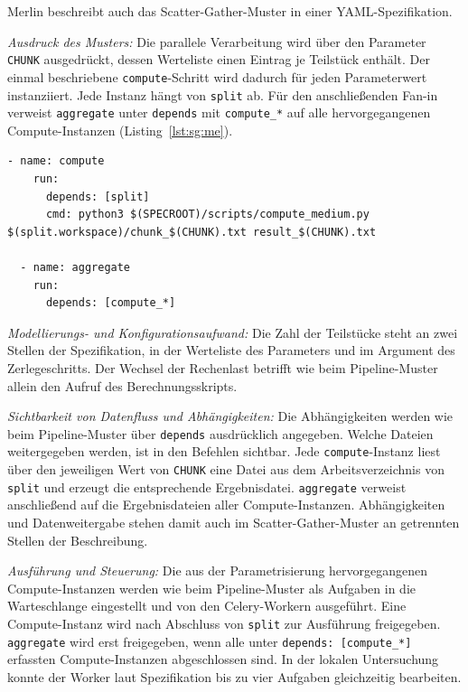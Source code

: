 Merlin beschreibt auch das Scatter-Gather-Muster in einer
YAML-Spezifikation.


\emph{Ausdruck des Musters:} Die parallele Verarbeitung wird über
den Parameter \texttt{CHUNK} ausgedrückt, dessen Werteliste einen
Eintrag je Teilstück enthält. Der einmal beschriebene
\texttt{compute}-Schritt wird dadurch für jeden Parameterwert
instanziiert. Jede Instanz hängt von \texttt{split} ab. Für den
anschließenden Fan-in verweist \texttt{aggregate} unter
\texttt{depends} mit \texttt{compute\_*} auf alle hervorgegangenen Compute-Instanzen (Listing~\ref{lst:sg:me}).

\begin{lstlisting}[caption={Parametrisierter Verarbeitungsschritt und Fan-in (Merlin, Scatter-Gather)},label={lst:sg:me}]
  - name: compute
    run:
      depends: [split]
      cmd: python3 $(SPECROOT)/scripts/compute_medium.py $(split.workspace)/chunk_$(CHUNK).txt result_$(CHUNK).txt

  - name: aggregate
    run:
      depends: [compute_*]
\end{lstlisting}

\emph{Modellierungs- und Konfigurationsaufwand:} Die Zahl der
Teilstücke steht an zwei Stellen der Spezifikation, in der
Werteliste des Parameters und im Argument des Zerlegeschritts. Der
Wechsel der Rechenlast betrifft wie beim Pipeline-Muster allein den
Aufruf des Berechnungsskripts.

\begin{sloppypar}
\emph{Sichtbarkeit von Datenfluss und Abhängigkeiten:} Die
Abhängigkeiten werden wie beim Pipeline-Muster über
\texttt{depends} ausdrücklich angegeben. Welche Dateien
weitergegeben werden, ist in den Befehlen sichtbar. Jede
\texttt{compute}-Instanz liest über den jeweiligen Wert von
\texttt{CHUNK} eine Datei aus dem Arbeitsverzeichnis von
\texttt{split} und erzeugt die entsprechende Ergebnisdatei.
\texttt{aggregate} verweist anschließend auf die Ergebnisdateien
aller Compute-Instanzen. Abhängigkeiten und Datenweitergabe stehen
damit auch im Scatter-Gather-Muster an getrennten Stellen der
Beschreibung.
\end{sloppypar}

\emph{Ausführung und Steuerung:} Die aus der Parametrisierung
hervorgegangenen Compute-Instanzen werden wie beim Pipeline-Muster
als Aufgaben in die Warteschlange eingestellt und von den
Celery-Workern ausgeführt. Eine Compute-Instanz wird nach Abschluss
von \texttt{split} zur Ausführung freigegeben. \texttt{aggregate}
wird erst freigegeben, wenn alle unter
\texttt{depends: [compute\_*]} erfassten Compute-Instanzen
abgeschlossen sind. In der lokalen Untersuchung konnte der Worker
laut Spezifikation bis zu vier Aufgaben gleichzeitig bearbeiten.

